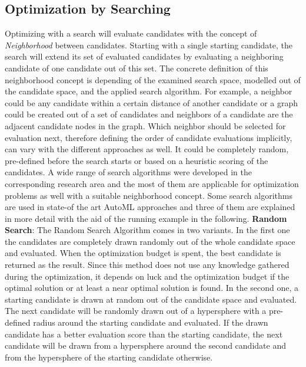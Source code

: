 \subsection{Optimization by Searching}
\label{sec:theory:optimization:search}
Optimizing with a search will evaluate candidates with the concept of \textit{Neighborhood} between candidates.
Starting with a single starting candidate, the search will extend its set of evaluated candidates by evaluating a neighboring candidate of one candidate out of this set.
The concrete definition of this neighborhood concept is depending of the examined search space, modelled out of the candidate space, and the applied search algorithm.
For example, a neighbor could be any candidate within a certain distance of another candidate or a graph could be created out of a set of candidates and neighbors of a candidate are the adjacent candidate nodes in the graph.
Which neighbor should be selected for evaluation next, therefore defining the order of candidate evaluations implicitly, can vary with the different approaches as well.
It could be completely random, pre-defined before the search starts or based on a heuristic scoring of the candidates.\newline
A wide range of search algorithms were developed in the corresponding research area and the most of them are applicable for optimization problems as well with a suitable neighborhood concept.
Some search algorithms are used in state-of the art AutoML approaches and three of them are explained in more detail with the aid of the running example in the following.\newline
\newline
\textbf{Random Search}: The Random Search Algorithm comes in two variants.
In the first one the candidates are completely drawn randomly out of the whole candidate space and evaluated.
When the optimization budget is spent, the best candidate is returned as the result.
Since this method does not use any knowledge gathered during the optimization, it depends on luck and the optimization budget if the optimal solution or at least a near optimal solution is found.\newline
In the second one, a starting candidate is drawn at random out of the candidate space and evaluated.
The next candidate will be randomly drawn out of a hypersphere with a pre-defined radius around the starting candidate and evaluated.
If the drawn candidate has a better evaluation score than the starting candidate, the next candidate will be drawn from a hypersphere around the second candidate and from the hypersphere of the starting candidate otherwise.
